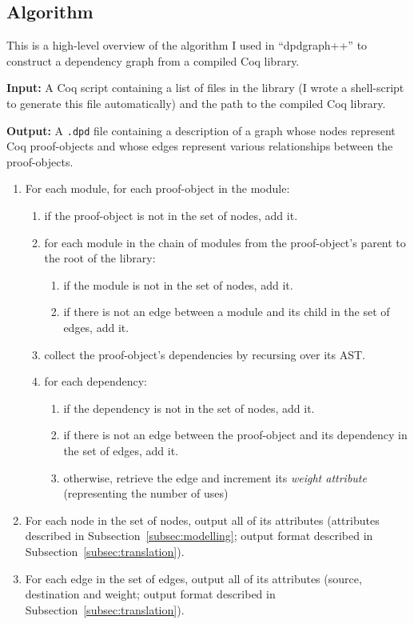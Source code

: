 \subsection{Algorithm}

This is a high-level overview of the algorithm I used in ``dpdgraph++'' to
construct a dependency graph from a compiled Coq library.

\textbf{Input:} A Coq script containing a list of files in the library (I wrote
a shell-script to generate this file automatically) and the path to the compiled
Coq library.

\textbf{Output:} A \texttt{.dpd} file containing a description of a graph whose
nodes represent Coq proof-objects and whose edges represent various
relationships between the proof-objects.

\begin{enumerate}

  \item For each module, for each proof-object in the module:

    \begin{enumerate}
      \item if the proof-object is not in the set of nodes, add it.
      \item for each module in the chain of modules from the proof-object's parent
        to the root of the library: 
        \begin{enumerate}
          \item if the module is not in the set of nodes, add it.
          \item if there is not an edge between a module and its child in the
            set of edges, add it.
        \end{enumerate}
      \item collect the proof-object's dependencies by recursing over its AST.
      \item for each dependency: 
        \begin{enumerate} 
          \item if the dependency is not in the set of nodes, add it.
          \item if there is not an edge between the proof-object and its
            dependency in the set of edges, add it.
          \item otherwise, retrieve the edge and increment its \emph{weight
            attribute} (representing the number of uses)
        \end{enumerate}
    \end{enumerate}
  
  \item For each node in the set of nodes, output all of its attributes
    (attributes described in Subsection~\ref{subsec:modelling}; output format described in
    Subsection~\ref{subsec:translation}).

  \item For each edge in the set of edges, output all of its attributes (source,
    destination and weight; output format described in
    Subsection~\ref{subsec:translation}).

\end{enumerate}

